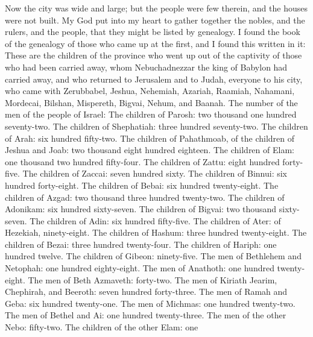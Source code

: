  Now the city was wide and large; but the people were few
therein, and the houses were not built.  My God put into
my heart to gather together the nobles, and the rulers, and the people,
that they might be listed by genealogy. I found the book of the
genealogy of those who came up at the first, and I found this written in
it:  These are the children of the province who went up
out of the captivity of those who had been carried away, whom
Nebuchadnezzar the king of Babylon had carried away, and who returned to
Jerusalem and to Judah, everyone to his city,  who came
with Zerubbabel, Jeshua, Nehemiah, Azariah, Raamiah, Nahamani, Mordecai,
Bilshan, Mispereth, Bigvai, Nehum, and Baanah. The number of the men of
the people of Israel:  The children of Parosh: two
thousand one hundred seventy-two.  The children of
Shephatiah: three hundred seventy-two.  The children of
Arah: six hundred fifty-two.  The children of Pahathmoab,
of the children of Jeshua and Joab: two thousand eight hundred eighteen.
 The children of Elam: one thousand two hundred
fifty-four.  The children of Zattu: eight hundred
forty-five.  The children of Zaccai: seven hundred sixty.
 The children of Binnui: six hundred forty-eight.
 The children of Bebai: six hundred twenty-eight.
 The children of Azgad: two thousand three hundred
twenty-two.  The children of Adonikam: six hundred
sixty-seven.  The children of Bigvai: two thousand
sixty-seven.  The children of Adin: six hundred
fifty-five.  The children of Ater: of Hezekiah,
ninety-eight.  The children of Hashum: three hundred
twenty-eight.  The children of Bezai: three hundred
twenty-four.  The children of Hariph: one hundred twelve.
 The children of Gibeon: ninety-five.  The
men of Bethlehem and Netophah: one hundred eighty-eight. 
The men of Anathoth: one hundred twenty-eight.  The men
of Beth Azmaveth: forty-two.  The men of Kiriath Jearim,
Chephirah, and Beeroth: seven hundred forty-three.  The
men of Ramah and Geba: six hundred twenty-one.  The men
of Michmas: one hundred twenty-two.  The men of Bethel
and Ai: one hundred twenty-three.  The men of the other
Nebo: fifty-two.  The children of the other Elam: one
